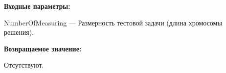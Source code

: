 \textbf{Входные параметры:}

NumberOfMeasuring --- Размерность тестовой задачи (длина хромосомы решения).

\textbf{Возвращаемое значение:}

Отсутствуют.